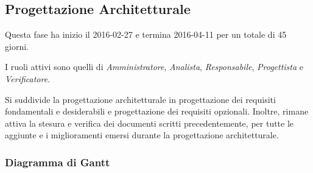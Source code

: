 \newpage

\subsection{Progettazione Architetturale}
Questa fase ha inizio il 2016-02-27 e termina 2016-04-11 per un totale di 45 giorni.

I ruoli attivi sono quelli di \textit{Amministratore}, \textit{Analista}, \textit{Responsabile}, \textit{Progettista} e \textit{Verificatore}.

Si suddivide la progettazione architetturale in progettazione dei requisiti fondamentali e desiderabili e progettazione dei requisiti opzionali. Inoltre, rimane attiva la stesura e verifica dei documenti scritti precedentemente, per tutte le aggiunte e i miglioramenti emersi durante la progettazione architetturale.

\subsubsection{Diagramma di Gantt}

